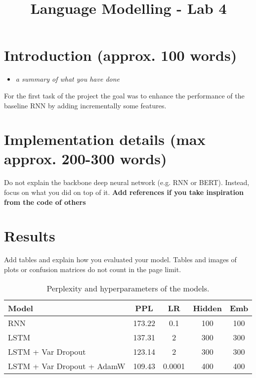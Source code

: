 \documentclass[a4paper]{article}
\title{Language Modelling - Lab 4}
\begin{document}
\maketitle
%
%
\section{Introduction (approx. 100 words)}
\begin{itemize}
    \item \textit{a summary of what you have done}
\end{itemize}
For the first task of the project the goal was to enhance the performance of the baseline RNN by 
adding incrementally some features.
\section{Implementation details (max approx. 200-300 words)}
Do not explain the backbone deep neural network (e.g. RNN or BERT). Instead, focus on what you did on top of it. \textbf{Add references if you take inspiration from the code of others}

\section{Results}
Add tables and explain how you evaluated your model. Tables and images of plots or confusion matrices do not count in the page limit.
\begin{table}[h!]
  \centering
  \begin{tabular}{lcccc}
      \toprule
      Model & PPL & LR & Hidden & Emb \\
      \midrule
      RNN                     & 173.22 & 0.1    & 100 & 100 \\
      LSTM                    & 137.31 & 2      & 300 & 300 \\
      LSTM + Var Dropout      & 123.14 & 2      & 300 & 300 \\
      LSTM + Var Dropout + AdamW & 109.43 & 0.0001 & 400 & 400 \\
      \bottomrule
  \end{tabular}
  \caption{Perplexity and hyperparameters of the models.}
  \label{tab:results}
\end{table}





\cite{Rabiner89-ATO}
\end{document}
